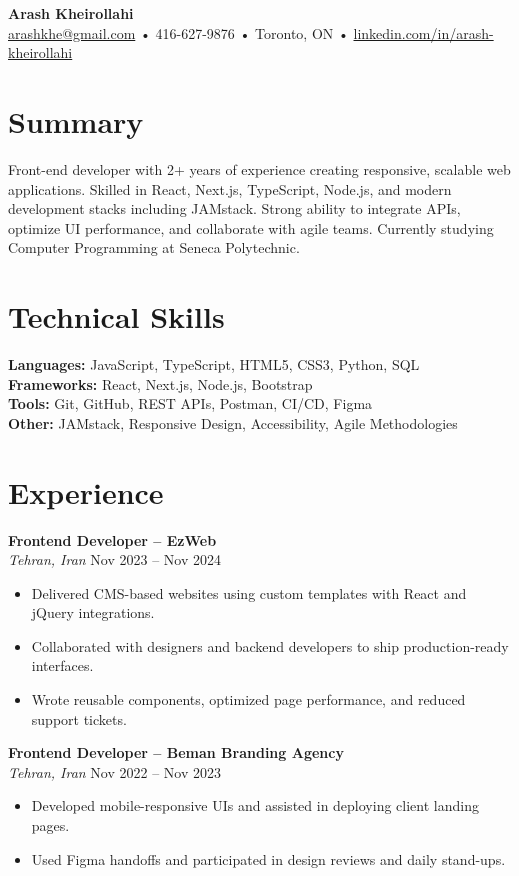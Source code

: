 \documentclass[letterpaper,11pt]{article}
\begin{document}

{\LARGE \textbf{Arash Kheirollahi}}\\
\href{mailto:arashkhe@gmail.com}{arashkhe@gmail.com} • 416-627-9876 • Toronto, ON • \href{https://linkedin.com/in/arash-kheirollahi}{linkedin.com/in/arash-kheirollahi}

\vspace{1em}

\section*{Summary}
Front-end developer with 2+ years of experience creating responsive, scalable web applications. Skilled in React, Next.js, TypeScript, Node.js, and modern development stacks including JAMstack. Strong ability to integrate APIs, optimize UI performance, and collaborate with agile teams. Currently studying Computer Programming at Seneca Polytechnic.

\section*{Technical Skills}
\textbf{Languages:} JavaScript, TypeScript, HTML5, CSS3, Python, SQL\\
\textbf{Frameworks:} React, Next.js, Node.js, Bootstrap\\
\textbf{Tools:} Git, GitHub, REST APIs, Postman, CI/CD, Figma\\
\textbf{Other:} JAMstack, Responsive Design, Accessibility, Agile Methodologies

\section*{Experience}
\textbf{Frontend Developer – EzWeb}\\
\textit{Tehran, Iran} \hfill Nov 2023 -- Nov 2024
\begin{itemize}[leftmargin=*]
  \item Delivered CMS-based websites using custom templates with React and jQuery integrations.
  \item Collaborated with designers and backend developers to ship production-ready interfaces.
  \item Wrote reusable components, optimized page performance, and reduced support tickets.
\end{itemize}

\textbf{Frontend Developer – Beman Branding Agency}\\
\textit{Tehran, Iran} \hfill Nov 2022 -- Nov 2023
\begin{itemize}[leftmargin=*]
  \item Developed mobile-responsive UIs and assisted in deploying client landing pages.
  \item Used Figma handoffs and participated in design reviews and daily stand-ups.
\end{itemize}
\end{document}
